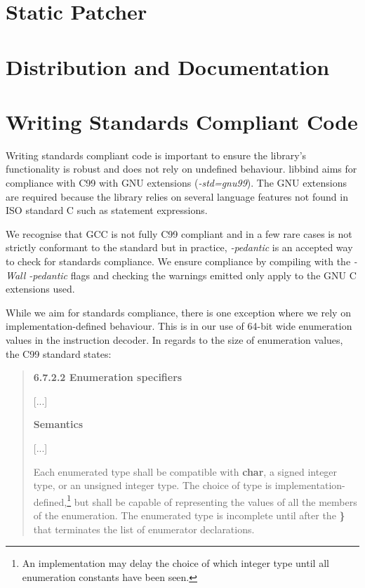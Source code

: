 \section{Static Patcher}\label{sec:Static_Patcher}

\section{Distribution and Documentation}

%
%

\section{Writing Standards Compliant Code}\label{sec:standards_compliance}

Writing standards compliant code is important to ensure the library's functionality is robust and does not rely on undefined behaviour. libbind aims for compliance with C99 with GNU extensions (\emph{-std=gnu99}). The GNU extensions are required because the library relies on several language features not found in ISO standard C such as statement expressions. 

We recognise that GCC is not fully C99 compliant and in a few rare cases is not strictly conformant to the standard but in practice, \emph{-pedantic} is an accepted way to check for standards compliance. We ensure compliance by compiling with the \emph{-Wall -pedantic} flags and checking the warnings emitted only apply to the GNU C extensions used.

While we aim for standards compliance, there is one exception where we rely on implementation-defined behaviour. This is in our use of 64-bit wide enumeration values in the instruction decoder. In regards to the size of enumeration values, the C99 standard states:

\begin{quote}
\begin{minipage}{\linewidth}
\textbf{6.7.2.2 Enumeration specifiers}

[...]

\textbf{Semantics}

[...]

Each enumerated type shall be compatible with \textbf{char}, a signed integer type, or an unsigned integer type. The choice of type is implementation-defined,\footnote{An implementation may delay the choice of which integer type until all enumeration constants have been seen.} but shall be capable of representing the values of all the members of the enumeration. The enumerated type is incomplete until after the \textbf{\}} that terminates the list of enumerator declarations.
\end{minipage}
\end{quote}

